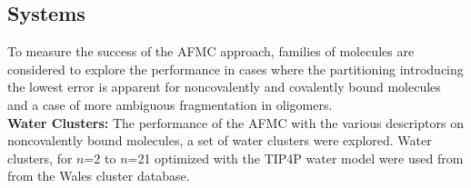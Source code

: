 

\subsection{\label{sec:frag_systems} Systems}

To measure the success of the AFMC approach, families of molecules are considered to explore the performance in cases where the partitioning introducing the lowest error is apparent for noncovalently and covalently bound molecules and a case of more ambiguous fragmentation in oligomers.\\ 
\noindent\textbf{Water Clusters: } The performance of the AFMC with the various descriptors on noncovalently bound molecules, a set of water clusters were explored. 
Water clusters,  for $n$=2 to $n$=21  optimized with the TIP4P water model were used from from the Wales cluster database.\autocite{wales_cambridge_nodate, 10.1063/1.445869}

